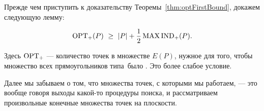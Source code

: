Прежде чем приступить к доказательству Теоремы~\ref{thm:optFirstBound}, докажем следующую лемму:

\begin{lemma} \label{lm:optPlusBound}
\begin{equation}
	\label{eq:optPlusBound}
	\operatorname{OPT}_+(P)\ \ge\ |P| + \frac{1}{2} \operatorname{MAX\,IND}_+ (P).
\end{equation}
\end{lemma}

Здесь $\operatorname{OPT}_+$ — количество точек в множестве $E(P)$, нужное для того, чтобы множество всех прямоугольников типа~\tpl было \arbs. Это более слабое условие.

Далее мы забываем о том, что множества точек, с которыми мы работаем, — это вообще говоря выходы какой-то процедуры поиска, и рассматриваем произвольные конечные множества точек на плоскости.

